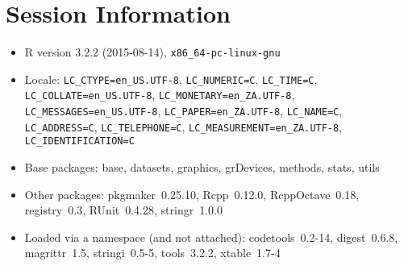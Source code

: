 \documentclass[10pt]{article}\usepackage[]{graphicx}\usepackage[]{color}
\begin{document}
\section*{Session Information}
\begin{itemize}\raggedright
  \item R version 3.2.2 (2015-08-14), \verb|x86_64-pc-linux-gnu|
  \item Locale: \verb|LC_CTYPE=en_US.UTF-8|, \verb|LC_NUMERIC=C|, \verb|LC_TIME=C|, \verb|LC_COLLATE=en_US.UTF-8|, \verb|LC_MONETARY=en_ZA.UTF-8|, \verb|LC_MESSAGES=en_US.UTF-8|, \verb|LC_PAPER=en_ZA.UTF-8|, \verb|LC_NAME=C|, \verb|LC_ADDRESS=C|, \verb|LC_TELEPHONE=C|, \verb|LC_MEASUREMENT=en_ZA.UTF-8|, \verb|LC_IDENTIFICATION=C|
  \item Base packages: base, datasets, graphics, grDevices, methods,
    stats, utils
  \item Other packages: pkgmaker~0.25.10, Rcpp~0.12.0, RcppOctave~0.18,
    registry~0.3, RUnit~0.4.28, stringr~1.0.0
  \item Loaded via a namespace (and not attached): codetools~0.2-14,
    digest~0.6.8, magrittr~1.5, stringi~0.5-5, tools~3.2.2,
    xtable~1.7-4
\end{itemize}
\end{document}
